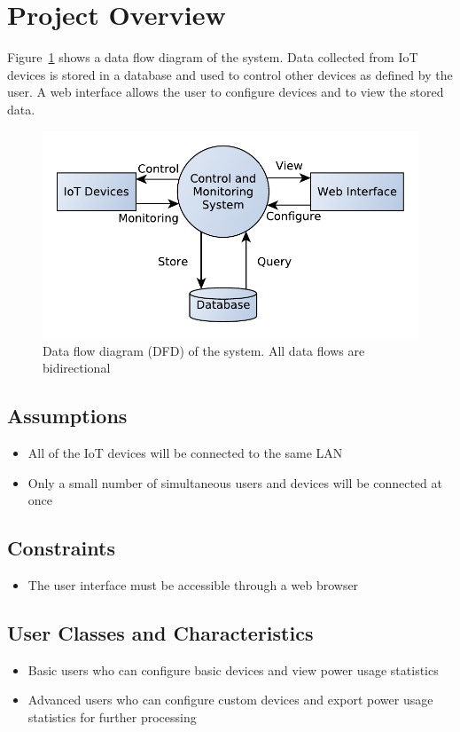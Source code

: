 \documentclass[11pt, a4paper]{article}
\begin{document}
	\section{Project Overview}
	
	Figure~\ref{fig:dfd} shows a data flow diagram of the system. Data collected from IoT devices is stored in a database and used to control other devices as defined by the user. A web interface allows the user to configure devices and to view the stored data.
	\begin{figure}
		\includegraphics[width=\columnwidth]{data-flow-1}
		\caption{Data flow diagram (DFD) of the system. All data flows are bidirectional}
		\label{fig:dfd}
	\end{figure}
	
	\subsection{Assumptions}
	\begin{itemize}
		\item All of the IoT devices will be connected to the same LAN
		\item Only a small number of simultaneous users and devices will be connected at once
	\end{itemize}
	\subsection{Constraints}
	\begin{itemize}
		\item The user interface must be accessible through a web browser
	\end{itemize}
	
	\subsection{User Classes and Characteristics}
	\begin{itemize}
		\item Basic users who can configure basic devices and view power usage statistics
		\item Advanced users who can configure custom devices and export power usage statistics for further processing
	\end{itemize}
	
\end{document}
